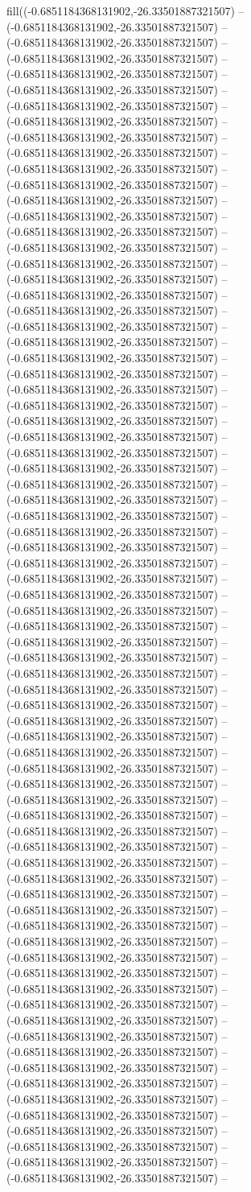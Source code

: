 fill((-0.6851184368131902,-26.33501887321507) -- (-0.6851184368131902,-26.33501887321507) -- (-0.6851184368131902,-26.33501887321507) -- (-0.6851184368131902,-26.33501887321507) -- (-0.6851184368131902,-26.33501887321507) -- (-0.6851184368131902,-26.33501887321507) -- (-0.6851184368131902,-26.33501887321507) -- (-0.6851184368131902,-26.33501887321507) -- (-0.6851184368131902,-26.33501887321507) -- (-0.6851184368131902,-26.33501887321507) -- (-0.6851184368131902,-26.33501887321507) -- (-0.6851184368131902,-26.33501887321507) -- (-0.6851184368131902,-26.33501887321507) -- (-0.6851184368131902,-26.33501887321507) -- (-0.6851184368131902,-26.33501887321507) -- (-0.6851184368131902,-26.33501887321507) -- (-0.6851184368131902,-26.33501887321507) -- (-0.6851184368131902,-26.33501887321507) -- (-0.6851184368131902,-26.33501887321507) -- (-0.6851184368131902,-26.33501887321507) -- (-0.6851184368131902,-26.33501887321507) -- (-0.6851184368131902,-26.33501887321507) -- (-0.6851184368131902,-26.33501887321507) -- (-0.6851184368131902,-26.33501887321507) -- (-0.6851184368131902,-26.33501887321507) -- (-0.6851184368131902,-26.33501887321507) -- (-0.6851184368131902,-26.33501887321507) -- (-0.6851184368131902,-26.33501887321507) -- (-0.6851184368131902,-26.33501887321507) -- (-0.6851184368131902,-26.33501887321507) -- (-0.6851184368131902,-26.33501887321507) -- (-0.6851184368131902,-26.33501887321507) -- (-0.6851184368131902,-26.33501887321507) -- (-0.6851184368131902,-26.33501887321507) -- (-0.6851184368131902,-26.33501887321507) -- (-0.6851184368131902,-26.33501887321507) -- (-0.6851184368131902,-26.33501887321507) -- (-0.6851184368131902,-26.33501887321507) -- (-0.6851184368131902,-26.33501887321507) -- (-0.6851184368131902,-26.33501887321507) -- (-0.6851184368131902,-26.33501887321507) -- (-0.6851184368131902,-26.33501887321507) -- (-0.6851184368131902,-26.33501887321507) -- (-0.6851184368131902,-26.33501887321507) -- (-0.6851184368131902,-26.33501887321507) -- (-0.6851184368131902,-26.33501887321507) -- (-0.6851184368131902,-26.33501887321507) -- (-0.6851184368131902,-26.33501887321507) -- (-0.6851184368131902,-26.33501887321507) -- (-0.6851184368131902,-26.33501887321507) -- (-0.6851184368131902,-26.33501887321507) -- (-0.6851184368131902,-26.33501887321507) -- (-0.6851184368131902,-26.33501887321507) -- (-0.6851184368131902,-26.33501887321507) -- (-0.6851184368131902,-26.33501887321507) -- (-0.6851184368131902,-26.33501887321507) -- (-0.6851184368131902,-26.33501887321507) -- (-0.6851184368131902,-26.33501887321507) -- (-0.6851184368131902,-26.33501887321507) -- (-0.6851184368131902,-26.33501887321507) -- (-0.6851184368131902,-26.33501887321507) -- (-0.6851184368131902,-26.33501887321507) -- (-0.6851184368131902,-26.33501887321507) -- (-0.6851184368131902,-26.33501887321507) -- (-0.6851184368131902,-26.33501887321507) -- (-0.6851184368131902,-26.33501887321507) -- (-0.6851184368131902,-26.33501887321507) -- (-0.6851184368131902,-26.33501887321507) -- (-0.6851184368131902,-26.33501887321507) -- (-0.6851184368131902,-26.33501887321507) -- (-0.6851184368131902,-26.33501887321507) -- (-0.6851184368131902,-26.33501887321507) -- (-0.6851184368131902,-26.33501887321507) -- (-0.6851184368131902,-26.33501887321507) -- (-0.6851184368131902,-26.33501887321507) -- 